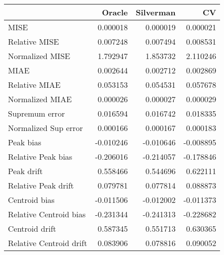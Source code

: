 \begin{tabular}{lrrr}
  \toprule
 & Oracle & Silverman & CV \\ 
  \midrule
MISE & 0.000018 & 0.000019 & 0.000021 \\ 
  Relative MISE & 0.007248 & 0.007494 & 0.008531 \\ 
  Normalized MISE & 1.792947 & 1.853732 & 2.110246 \\ 
  MIAE & 0.002644 & 0.002712 & 0.002869 \\ 
  Relative MIAE & 0.053153 & 0.054531 & 0.057678 \\ 
  Normalized MIAE & 0.000026 & 0.000027 & 0.000029 \\ 
  Supremum error & 0.016594 & 0.016742 & 0.018335 \\ 
  Normalized Sup error & 0.000166 & 0.000167 & 0.000183 \\ 
  Peak bias & -0.010246 & -0.010646 & -0.008895 \\ 
  Relative Peak bias & -0.206016 & -0.214057 & -0.178846 \\ 
  Peak drift & 0.558466 & 0.544696 & 0.622111 \\ 
  Relative Peak drift & 0.079781 & 0.077814 & 0.088873 \\ 
  Centroid bias & -0.011506 & -0.012002 & -0.011373 \\ 
  Relative Centroid bias & -0.231344 & -0.241313 & -0.228682 \\ 
  Centroid drift & 0.587345 & 0.551713 & 0.630365 \\ 
  Relative Centroid drift & 0.083906 & 0.078816 & 0.090052 \\ 
   \bottomrule
\end{tabular}
